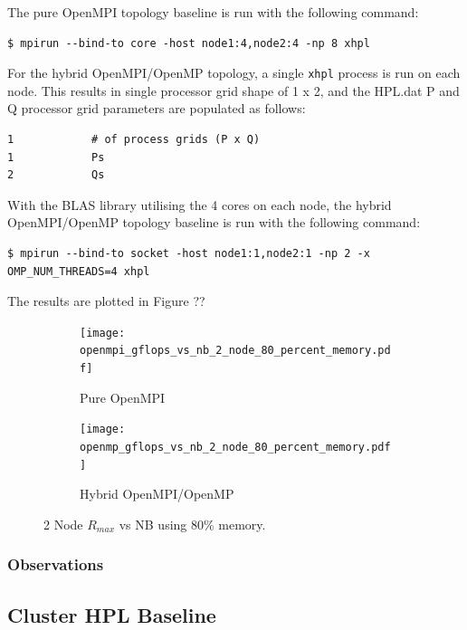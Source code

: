 \documentclass{report}
\begin{document}
The pure OpenMPI topology baseline is run with the following command:

\lstset{style=type}
\begin{lstlisting}[]
$ mpirun --bind-to core -host node1:4,node2:4 -np 8 xhpl
\end{lstlisting}

For the hybrid OpenMPI/OpenMP topology, a single \verb|xhpl| process is run on each node. This results in single processor grid shape of 1 x 2, and the HPL.dat P and Q processor grid parameters are populated as follows:

\lstset{style=listing}
\begin{lstlisting}[numbers=none]
1            # of process grids (P x Q)
1            Ps
2            Qs
\end{lstlisting}

With the BLAS library utilising the 4 cores on each node, the hybrid OpenMPI/OpenMP topology baseline is run with the following command:

\lstset{style=type}
\begin{lstlisting}[]
$ mpirun --bind-to socket -host node1:1,node2:1 -np 2 -x OMP_NUM_THREADS=4 xhpl
\end{lstlisting}

The results are plotted in Figure ??

\begin{figure}[H]
	\begin{subfigure}{1.0\textwidth}
		\centering
		\texttt{[image: openmpi\_gflops\_vs\_nb\_2\_node\_80\_percent\_memory.pdf]}
		\caption{Pure OpenMPI}
		\label{fig:subim1}
	\end{subfigure}
	\par\bigskip
	\begin{subfigure}{1.0\textwidth}
		\centering
		\texttt{[image: openmp\_gflops\_vs\_nb\_2\_node\_80\_percent\_memory.pdf]}
		\caption{Hybrid OpenMPI/OpenMP}
		\label{fig:subim2}
	\end{subfigure}
\caption{2 Node $R_{max}$ vs NB using 80\% memory.}
\label{fig:image2}
\end{figure}



%
%
\subsubsection{Observations}




%
%
\subsection{Cluster HPL Baseline}
\end{document}
